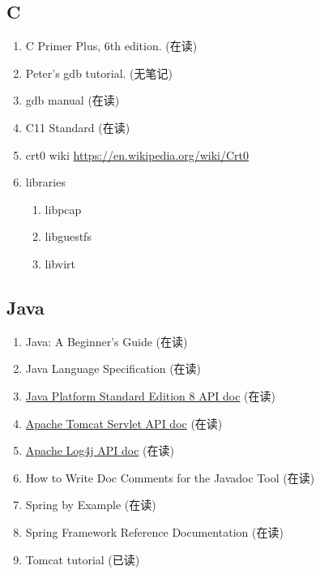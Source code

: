 \documentclass{article}
\begin{document}
\subsection{C}
\begin{enumerate}
    \item C Primer Plus, 6th edition. (在读)
    \item Peter's gdb tutorial. (无笔记)
    \item gdb manual (在读)
    \item C11 Standard (在读)
    \item crt0 wiki \url{https://en.wikipedia.org/wiki/Crt0}
    \item libraries
        \begin{enumerate}
            \item libpcap
            \item libguestfs
            \item libvirt
        \end{enumerate}
\end{enumerate}
\subsection{Java}
\begin{enumerate}
    \item Java: A Beginner's Guide (在读)
    \item Java Language Specification (在读)
    \item \href{http://docs.oracle.com/javase/8/docs/api/index.html?overview-summary.html}{Java Platform Standard Edition 8 API doc} (在读)
    \item \href{http://tomcat.apache.org/tomcat-8.0-doc/servletapi/}{Apache Tomcat Servlet API doc} (在读)
    \item \href{http://logging.apache.org/log4j/2.x/log4j-api/apidocs/index.html}{Apache Log4j API doc} (在读)
    \item How to Write Doc Comments for the Javadoc Tool (在读)
    \item Spring by Example (在读)
    \item Spring Framework Reference Documentation (在读)
    \item Tomcat tutorial (已读)
\end{enumerate}
\end{document}
